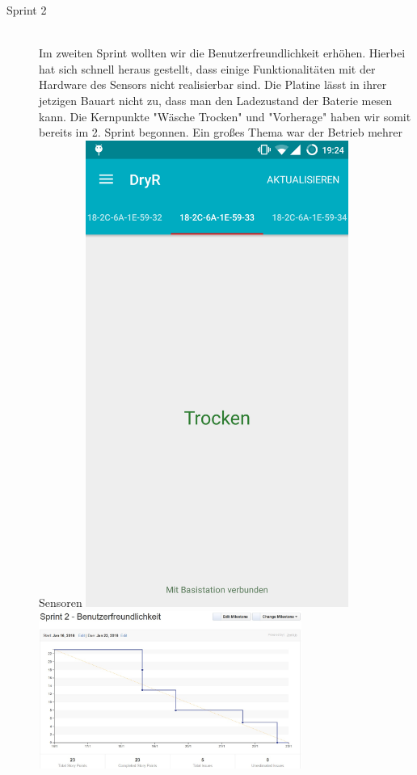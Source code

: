 \begin{description}
	\item [Sprint 2] \hfill \\
		Im zweiten Sprint wollten wir die Benutzerfreundlichkeit erhöhen.
		Hierbei hat sich schnell heraus gestellt, dass einige Funktionalitäten mit der Hardware des Sensors nicht realisierbar sind. Die Platine lässt in ihrer jetzigen Bauart nicht zu, dass man den Ladezustand der Baterie mesen kann. Die Kernpunkte "Wäsche Trocken" und "Vorherage" haben wir somit bereits im 2. Sprint begonnen. Ein großes Thema war der Betrieb mehrer Sensoren 
		\includegraphics[width=0.7\textwidth]{laundry_status_multiple_sensors.png}
		\includegraphics[width=0.7\textwidth]{burndown_sprint2.jpg}

\end{description}
